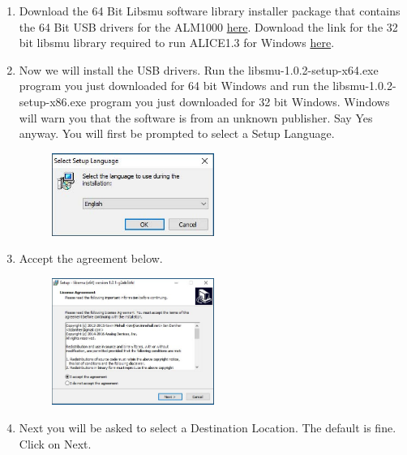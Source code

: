 \documentclass[12pt]{../manual}
\begin{document}
\begin{enumerate}
\item Download the 64 Bit Libsmu software library installer package that contains the 64 Bit USB drivers for the ALM1000 \href{https://github.com/analogdevicesinc/libsmu/releases/download/v1.0.2/libsmu-1.0.2-setup-x64.exe}{here}. Download the link for the 32 bit libsmu library required to run ALICE1.3 for Windows  \href{https://github.com/analogdevicesinc/libsmu/releases/download/v1.0.2/libsmu-1.0.2-setup-x86.exe}{here}.
\item Now we will install the USB drivers. Run the libsmu-1.0.2-setup-x64.exe program you just downloaded for 64 bit Windows and run the libsmu-1.0.2-setup-x86.exe program you just downloaded for 32 bit Windows. Windows will warn you that the software is from an unknown publisher. Say Yes anyway. You will first be prompted to select a Setup Language.
\begin{figure}[!ht]
\begin{center}
\includegraphics[width=0.5\textwidth]{figures/SetupLanguage}
\end{center}
\end{figure}
\item Accept the agreement below.
\begin{figure}[!ht]
\begin{center}
\includegraphics[width=0.5\textwidth]{figures/Agreement}
\end{center}
\end{figure}
\newpage
\item Next you will be asked to select a Destination Location. The default is fine. Click on Next.
\begin{figure}[!ht]

\end{figure}
\end{enumerate}
\end{document}
